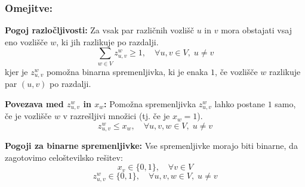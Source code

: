 \documentclass[a4paper,12pt]{article}
\theoremstyle{definition}
\theoremstyle{remark}
\theoremstyle{definition}
\begin{document}
\subsubsection*{Omejitve:}

\textbf{Pogoj razločljivosti:}
   Za vsak par različnih vozlišč $u$ in $v$ mora obstajati vsaj eno vozlišče $w$, ki jih razlikuje po razdalji.
   \begin{equation*}
   \sum_{w \in V} z_{u,v}^w \geq 1, \quad \forall u, v \in V, \; u \neq v
   \end{equation*}
   kjer je $z_{u,v}^w$ pomožna binarna spremenljivka, ki je enaka $1$, če vozlišče $w$ razlikuje par $(u, v)$ po razdalji.

\noindent
\textbf{Povezava med $z_{u,v}^w$ in $x_w$:}
   Pomožna spremenljivka $z_{u,v}^w$ lahko postane $1$ samo, če je vozlišče $w$ v razrešljivi množici (tj. če je $x_w = 1$). 
   \begin{equation*}
   z_{u,v}^w \leq x_w, \quad \forall u, v, w \in V, \; u \neq v
   \end{equation*}

\noindent
\textbf{Pogoji za binarne spremenljivke:}
    Vse spremenljivke morajo biti binarne, da zagotovimo celoštevilsko rešitev:
   \begin{equation*}
   x_v \in \{0, 1\}, \quad \forall v \in V
   \end{equation*}
   \begin{equation*}
   z_{u,v}^w \in \{0, 1\}, \quad \forall u, v, w \in V, \; u \neq v
   \end{equation*}





\end{document}
